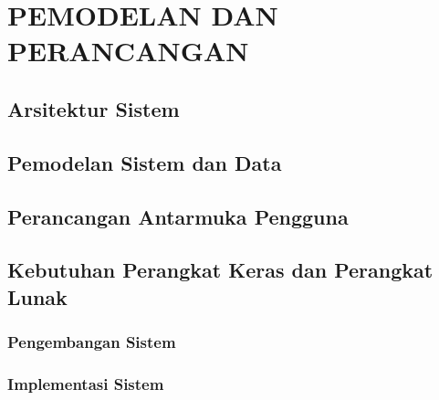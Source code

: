 \chapter{PEMODELAN DAN PERANCANGAN}
\label{chapter:PEMODELAN DAN PERANCANGAN}
\section{Arsitektur Sistem}
\section{Pemodelan Sistem dan Data}
\section{Perancangan Antarmuka Pengguna}
\section{Kebutuhan Perangkat Keras dan Perangkat Lunak}
\subsection{Pengembangan Sistem}
\subsection{Implementasi Sistem}
